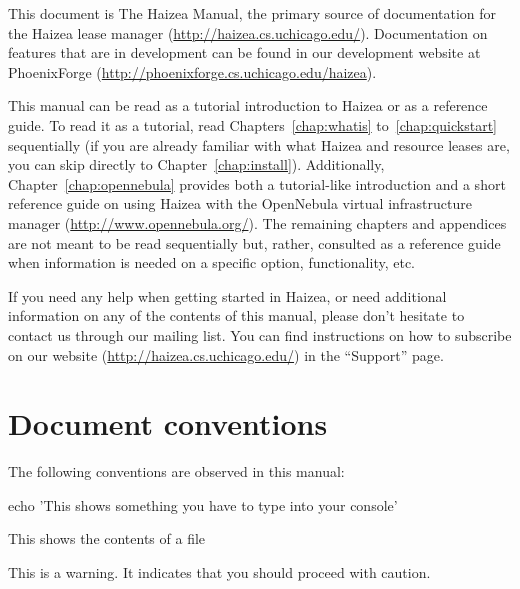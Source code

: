 
This document is The Haizea Manual, the primary source of documentation for the Haizea lease manager (\url{http://haizea.cs.uchicago.edu/}). Documentation on features that are in development can be found in our development website at PhoenixForge (\url{http://phoenixforge.cs.uchicago.edu/haizea}). 

This manual can be read as a tutorial introduction to Haizea or as a reference guide. To read it as a tutorial, read Chapters~\ref{chap:whatis} to~\ref{chap:quickstart} sequentially (if you are already familiar with what Haizea and resource leases are, you can skip directly to Chapter~\ref{chap:install}). Additionally, Chapter~\ref{chap:opennebula} provides both a tutorial-like introduction and a short reference guide on using Haizea with the OpenNebula virtual infrastructure manager (\url{http://www.opennebula.org/}). The remaining chapters and appendices are not meant to be read sequentially but, rather, consulted as a reference guide when information is needed on a specific option, functionality, etc.

If you need any help when getting started in Haizea, or need additional information on any of the contents of this manual, please don't hesitate to contact us through our mailing list. You can find instructions on how to subscribe on our website (\url{http://haizea.cs.uchicago.edu/}) in the ``Support'' page.

\section*{Document conventions}

The following conventions are observed in this manual:

\begin{shellverbatim}
echo 'This shows something you have to type into your console'
\end{shellverbatim}

\begin{wideshellverbatim}
This shows the contents of a file
\end{wideshellverbatim}

\begin{warning}
This is a warning. It indicates that you should proceed with caution.
\end{warning}